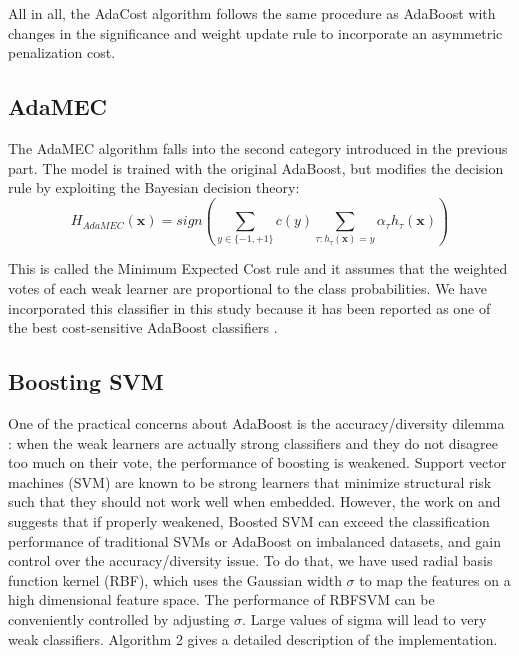 \documentclass[conference]{IEEEtran}
\begin{document}
All in all, the AdaCost algorithm follows the same procedure as AdaBoost with changes in the significance and weight update rule to incorporate an asymmetric penalization cost.

\subsection{AdaMEC}
The AdaMEC algorithm falls into the second category introduced in the previous part. The model is trained with the original AdaBoost, but modifies the decision rule by exploiting the Bayesian decision theory:
$$ H_{AdaMEC}(\boldsymbol x) = sign \left( \sum_{y \in \{-1,+1\}} c(y) \sum_{\tau: h_{\tau}(\boldsymbol x)=y} \alpha_{\tau} h_{\tau}(\boldsymbol x)\right)$$

This is called the Minimum Expected Cost rule and it assumes that the weighted votes of each weak learner are proportional to the class probabilities. We have incorporated this classifier in this study because it has been reported as one of the best cost-sensitive AdaBoost classifiers \cite{need_boosting}.


\subsection{Boosting SVM}
One of the practical concerns about AdaBoost is the accuracy/diversity dilemma \cite{study_boosted_svm}: when the weak learners are actually strong classifiers and they do not disagree too much on their vote, the performance of boosting is weakened. Support vector machines (SVM) are known to be strong learners that minimize structural risk such that they should not work well when embedded. However, the work on \cite{study_boosted_svm} and \cite{boosting_svm} suggests that if properly weakened, Boosted SVM can exceed the classification performance of traditional SVMs or AdaBoost on imbalanced datasets, and gain control over the accuracy/diversity issue. To do that, we have used radial basis function kernel (RBF), which uses the Gaussian width $\sigma$ to map the features on a high dimensional feature space. The performance of RBFSVM can be conveniently controlled by adjusting $\sigma$. Large values of sigma will lead to very weak classifiers. Algorithm 2 gives a detailed description of the implementation.
\end{document}
